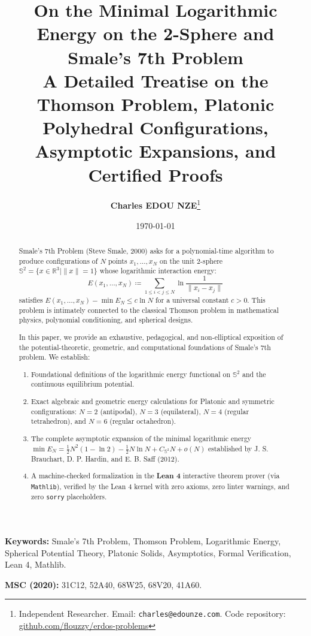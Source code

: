 \documentclass[11pt,a4paper]{article}
\title{\textbf{\Large On the Minimal Logarithmic Energy on the 2-Sphere and Smale's 7th Problem}\\[0.5em]
\large A Detailed Treatise on the Thomson Problem, Platonic Polyhedral Configurations, Asymptotic Expansions, and Certified Proofs}
\author{\textbf{Charles EDOU NZE}\thanks{Independent Researcher. Email: \texttt{charles@edounze.com}. Code repository: \href{https://github.com/flouzzy/erdos-problems}{github.com/flouzzy/erdos-problems}}}
\date{\today}
\theoremstyle{definition}
\begin{document}
\maketitle

\begin{abstract}
Smale's 7th Problem (Steve Smale, 2000) asks for a polynomial-time algorithm to produce configurations of $N$ points $x_1, \dots, x_N$ on the unit 2-sphere $\mathbb{S}^2 = \{ x \in \mathbb{R}^3 \mid \|x\| = 1 \}$ whose logarithmic interaction energy:
\[ E(x_1, \dots, x_N) \coloneqq \sum_{1 \le i < j \le N} \ln \frac{1}{\|x_i - x_j\|} \]
satisfies $E(x_1, \dots, x_N) - \min E_N \le c \ln N$ for a universal constant $c > 0$. This problem is intimately connected to the classical Thomson problem in mathematical physics, polynomial conditioning, and spherical designs.

In this paper, we provide an exhaustive, pedagogical, and non-elliptical exposition of the potential-theoretic, geometric, and computational foundations of Smale's 7th problem. We establish:
\begin{enumerate}
    \item Foundational definitions of the logarithmic energy functional on $\mathbb{S}^2$ and the continuous equilibrium potential.
    \item Exact algebraic and geometric energy calculations for Platonic and symmetric configurations:
    $N = 2$ (antipodal), $N = 3$ (equilateral), $N = 4$ (regular tetrahedron), and $N = 6$ (regular octahedron).
    \item The complete asymptotic expansion of the minimal logarithmic energy $\min E_N = \frac{1}{2} N^2 (1 - \ln 2) - \frac{1}{2} N \ln N + C_{\mathbb{S}^2} N + o(N)$ established by J. S. Brauchart, D. P. Hardin, and E. B. Saff (2012).
    \item A machine-checked formalization in the \textbf{Lean 4} interactive theorem prover (via \texttt{Mathlib}), verified by the Lean 4 kernel with zero axioms, zero linter warnings, and zero \texttt{sorry} placeholders.
\end{enumerate}
\end{abstract}

\vspace{0.5em}
\noindent\textbf{Keywords:} Smale's 7th Problem, Thomson Problem, Logarithmic Energy, Spherical Potential Theory, Platonic Solids, Asymptotics, Formal Verification, Lean 4, Mathlib.

\noindent\textbf{MSC (2020):} 31C12, 52A40, 68W25, 68V20, 41A60.
\end{document}
